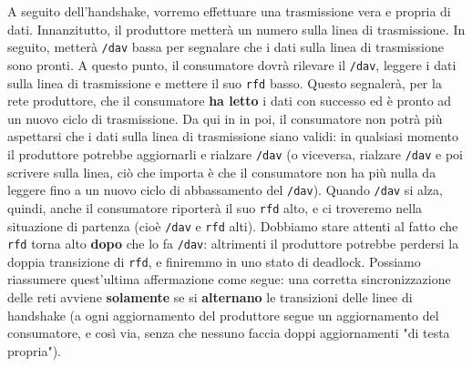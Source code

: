 \documentclass[a4paper,11pt]{article}
\begin{document}
A seguito dell'handshake, vorremo effettuare una trasmissione vera e propria di dati.
Innanzitutto, il produttore metterà un numero sulla linea di trasmissione.
In seguito, metterà \lstinline|/dav| bassa per segnalare che i dati sulla linea di trasmissione sono pronti.
A questo punto, il consumatore dovrà rilevare il \lstinline|/dav|, leggere i dati sulla linea di trasmissione e mettere il suo \lstinline|rfd| basso.
Questo segnalerà, per la rete produttore, che il consumatore \textbf{ha letto}
 i dati con successo ed è pronto ad un nuovo ciclo di trasmissione.
Da qui in in poi, il consumatore non potrà più aspettarsi che i dati sulla linea di trasmissione siano validi: in qualsiasi momento il produttore potrebbe aggiornarli e rialzare \lstinline|/dav| (o viceversa, rialzare \lstinline|/dav| e poi scrivere sulla linea, ciò che importa è che il consumatore non ha più nulla da leggere fino a un nuovo ciclo di abbassamento del \lstinline|/dav|).
Quando \lstinline|/dav| si alza, quindi, anche il consumatore riporterà il suo \lstinline|rfd| alto, e ci troveremo nella situazione di partenza (cioè \lstinline|/dav| e \lstinline|rfd| alti).
Dobbiamo stare attenti al fatto che \lstinline|rfd| torna alto \textbf{dopo} che lo fa \lstinline|/dav|: altrimenti il produttore potrebbe perdersi la doppia transizione di \lstinline|rfd|, e finiremmo in uno stato di deadlock.
Possiamo riassumere quest'ultima affermazione come segue: una corretta sincronizzazione delle reti avviene \textbf{solamente} se si \textbf{alternano} le transizioni delle linee di handshake (a ogni aggiornamento del produttore segue un aggiornamento del consumatore, e così via, senza che nessuno faccia doppi aggiornamenti "di testa propria").
\end{document}
